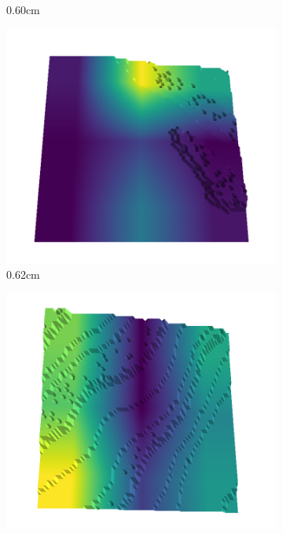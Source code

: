 \documentclass[../document.tex]{subfiles}
\begin{document}
\begin{figure}[H]
\begin{subfigure}[b]{0.192\linewidth}
    \caption{0.60cm}
    \label{fig : quarry-best-14}
    \end{subfigure}
    \begin{subfigure}[b]{0.192\linewidth}
    \includegraphics[width=\linewidth]{../img/5/quarry/best/62-patch-3d-majavi-colormap-140.png}
    \caption{0.62cm}
    \label{fig : quarry-best-15}
    \end{subfigure}
    \begin{subfigure}[b]{0.192\linewidth}
    \includegraphics[width=\linewidth]{../img/5/quarry/best/63-patch-3d-majavi-colormap-150.png}

\end{subfigure}
\end{figure}
\end{document}
